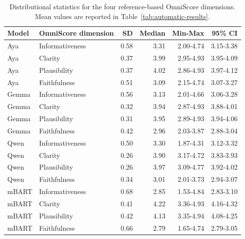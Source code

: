\documentclass[11pt]{article}
\begin{document}
\begin{table}[t]
\centering
\scriptsize
\setlength{\tabcolsep}{5pt}
\begin{tabular}{llrrrr}
\hline
Model & OmniScore dimension & SD & Median & Min-Max & 95\% CI \\
\hline
Aya   & Informativeness & 0.58 & 3.31 & 2.00-4.74 & 3.15-3.38 \\
Aya   & Clarity         & 0.37 & 3.99 & 2.95-4.93 & 3.95-4.09 \\
Aya   & Plausibility    & 0.37 & 4.02 & 2.86-4.93 & 3.97-4.12 \\
Aya   & Faithfulness    & 0.51 & 3.09 & 2.15-4.74 & 3.07-3.27 \\
Gemma & Informativeness & 0.56 & 3.13 & 2.01-4.66 & 3.06-3.28 \\
Gemma & Clarity         & 0.32 & 3.94 & 2.87-4.93 & 3.88-4.01 \\
Gemma & Plausibility    & 0.31 & 3.95 & 2.89-4.93 & 3.94-4.06 \\
Gemma & Faithfulness    & 0.42 & 2.96 & 2.03-3.87 & 2.88-3.04 \\
Qwen  & Informativeness & 0.50 & 3.30 & 1.87-4.31 & 3.12-3.32 \\
Qwen  & Clarity         & 0.26 & 3.90 & 3.17-4.72 & 3.83-3.93 \\
Qwen  & Plausibility    & 0.26 & 3.97 & 3.09-4.77 & 3.92-4.02 \\
Qwen  & Faithfulness    & 0.34 & 3.01 & 2.01-3.73 & 2.94-3.07 \\
mBART & Informativeness & 0.68 & 2.85 & 1.53-4.84 & 2.83-3.10 \\
mBART & Clarity         & 0.41 & 4.22 & 3.36-4.93 & 4.16-4.32 \\
mBART & Plausibility    & 0.42 & 4.13 & 3.35-4.94 & 4.08-4.25 \\
mBART & Faithfulness    & 0.66 & 2.79 & 1.65-4.74 & 2.79-3.05 \\
\hline
\end{tabular}
\caption{Distributional statistics for the four reference-based OmniScore dimensions. Mean values are reported in Table~\ref{tab:automatic-results}.}
\label{tab:omniscore-distributions}
\end{table}
\end{document}
